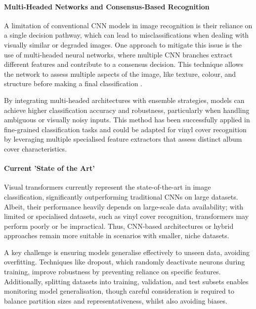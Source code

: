             \paragraph{Multi-Headed Networks and Consensus-Based Recognition}
    
                A limitation of conventional CNN models in image recognition is their reliance on a single decision pathway, which can lead to misclassifications when dealing with visually similar or degraded images. One approach to mitigate this issue is the use of multi-headed neural networks, where multiple CNN branches extract different features and contribute to a consensus decision. This technique allows the network to assess multiple aspects of the image, like texture, colour, and structure before making a final classification \cite{Zheng2017}. 
            
                By integrating multi-headed architectures with ensemble strategies, models can achieve higher classification accuracy and robustness, particularly when handling ambiguous or visually noisy inputs. This method has been successfully applied in fine-grained classification tasks and could be adapted for vinyl cover recognition by leveraging multiple specialised feature extractors that assess distinct album cover characteristics.
    
            \paragraph{Current 'State of the Art'}
    
                Visual transformers currently represent the state-of-the-art in image classification, significantly outperforming traditional CNNs on large datasets. Albeit, their performance heavily depends on large-scale data availability; with limited or specialised datasets, such as vinyl cover recognition, transformers may perform poorly or be impractical. Thus, CNN-based architectures or hybrid approaches remain more suitable in scenarios with smaller, niche datasets.
    
                A key challenge is ensuring models generalise effectively to unseen data, avoiding overfitting. Techniques like dropout, which randomly deactivate neurons during training, improve robustness by preventing reliance on specific features. Additionally, splitting datasets into training, validation, and test subsets enables monitoring model generalisation, though careful consideration is required to balance partition sizes and representativeness, whilst also avoiding biases.
    
